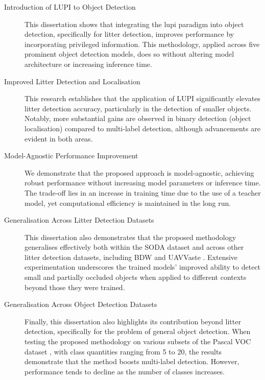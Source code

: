 \begin{description}
    \item [Introduction of LUPI to Object Detection]  
    This dissertation shows that integrating the \gls{lupi} paradigm into object detection, specifically for litter detection, improves performance by incorporating privileged information. This methodology, applied across five prominent object detection models, does so without altering model architecture or increasing inference time.

    \item [Improved Litter Detection and Localisation]  
    This research establishes that the application of LUPI significantly elevates litter detection accuracy, particularly in the detection of smaller objects. Notably, more substantial gains are observed in binary detection (object localisation) compared to multi-label detection, although advancements are evident in both areas.

    \item [Model-Agnostic Performance Improvement]  
    We demonstrate that the proposed approach is model-agnostic, achieving robust performance without increasing model parameters or inference time. The trade-off lies in an increase in training time due to the use of a teacher model, yet computational efficiency is maintained in the long run.

    \item [Generalisation Across Litter Detection Datasets]  
    This dissertation also demonstrates that the proposed methodology generalises effectively both within the SODA dataset \cite{soda_dataset} and across other litter detection datasets, including BDW \cite{bdwdataset} and UAVVaste \cite{uavvaste}. Extensive experimentation underscores the trained models' improved ability to detect small and partially occluded objects when applied to different contexts beyond those they were trained.

    \item [Generalisation Across Object Detection Datasets]  
    Finally, this dissertation also highlights its contribution beyond litter detection, specifically for the problem of general object detection. When testing the proposed methodology on various subsets of the Pascal VOC dataset \cite{pascal-voc-2012}, with class quantities ranging from 5 to 20, the results demonstrate that the method boosts multi-label detection. However, performance tends to decline as the number of classes increases.

\end{description}

